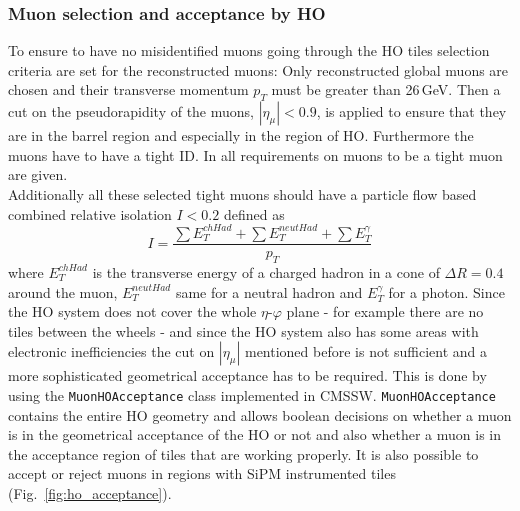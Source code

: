 		\subsubsection{Muon selection and acceptance by HO}
		\label{thesectionhere}
			To ensure to have no misidentified muons going through the HO tiles selection criteria are set for the reconstructed muons:
			Only reconstructed global muons are chosen and their transverse momentum $p_T$ must be greater than 26\,GeV.
			Then a cut on the pseudorapidity of the muons, $|\eta_\mu| < 0.9$, is applied to ensure that they are in the barrel region and especially in the region of HO.
			Furthermore the muons have to have a tight ID.
			In \cite{CMS-PAPER-MUO-10-004} all requirements on muons to be a tight muon are given. \\
			Additionally all these selected tight muons should have a particle flow based combined relative isolation $I<0.2$ defined as
			\begin{equation}
				I = \frac{\sum{E_T^{chHad}} + \sum{E_T^{neutHad}} + \sum{E_T^\gamma}}{p_T}
			\end{equation}
			where $E_T^{chHad}$ is the transverse energy of a charged hadron in a cone of $\Delta R = 0.4$ around the muon, $E_T^{neutHad}$ same for a neutral hadron and $E_T^\gamma$ for a photon.
			Since the HO system does not cover the whole $\eta$-$\varphi$ plane - for example there are no tiles between the wheels - and since the HO system also has some areas with electronic inefficiencies
			the cut on $|\eta_{\mu}|$ mentioned before is not sufficient and a more sophisticated geometrical acceptance has to be required.
			This is done by using the \verb+MuonHOAcceptance+ class implemented in CMSSW.
			\verb+MuonHOAcceptance+ contains the entire HO geometry and allows boolean decisions on whether a muon is in the geometrical acceptance of the HO or not and also whether a muon is in the
			acceptance region of tiles that are working properly.
			It is also possible to accept or reject muons in regions with SiPM instrumented tiles (Fig.\ \ref{fig:ho_acceptance}).
